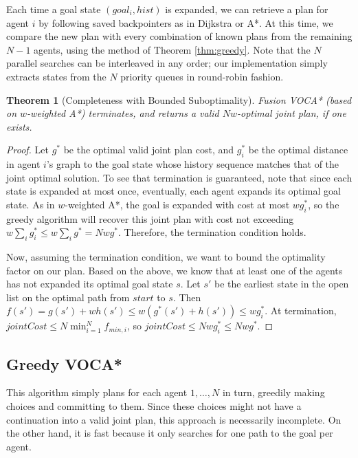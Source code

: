\documentclass[letterpaper]{article}
\newtheorem{thm}{Theorem}
\begin{document}
Each time a goal state $(goal_i, hist)$ is expanded, we can retrieve a plan for agent $i$ by following saved backpointers as in Dijkstra or A*. At this time, we compare the new plan with every combination of known plans from the remaining $N-1$ agents, using the method of Theorem \ref{thm:greedy}. Note that the $N$ parallel searches can be interleaved in any order; our implementation simply extracts states from the $N$ priority queues in round-robin fashion.

\begin{thm}[Completeness with Bounded Suboptimality]
\label{thm:complete}
Fusion VOCA* (based on $w$-weighted A*) terminates, and returns a valid $Nw$-optimal joint plan, if one exists.
\end{thm}

\begin{proof}
Let $g^*$ be the optimal valid joint plan cost, and $g_i^*$ be the optimal distance in agent $i$'s graph to the goal state whose history sequence matches that of the joint optimal solution. To see that termination is guaranteed, note that since each state is expanded at most once, eventually, each agent expands its optimal goal state. As in $w$-weighted A*, the goal is expanded with cost at most $w g_i^*$, so the greedy algorithm will recover this joint plan with cost not exceeding $w \sum_i g_i^* \le w \sum_i g^* = Nw g^*$. Therefore, the termination condition holds.

Now, assuming the termination condition, we want to bound the optimality factor on our plan. Based on the above, we know that at least one of the agents has not expanded its optimal goal state $s$. Let $s'$ be the earliest state in the open list on the optimal path from $start$ to $s$. Then $f(s') = g(s') + wh(s') \le w(g^*(s') + h(s')) \le w g_i^*$. At termination, $jointCost \le N \min_{i=1}^N f_{min,i}$, so $jointCost \le Nw g_i^* \le Nw g^*$.
\end{proof}

\subsection{Greedy VOCA*}

This algorithm simply plans for each agent $1,\ldots,N$ in turn, greedily making choices and committing to them. Since these choices might not have a continuation into a valid joint plan, this approach is necessarily incomplete. On the other hand, it is fast because it only searches for one path to the goal per agent.
\end{document}
